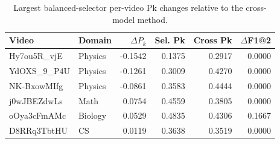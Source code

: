 \begin{table}[t]
\centering
\small
\caption{Largest balanced-selector per-video Pk changes relative to the cross-model method.}
\label{tab:selector_choice_audit}
\begin{tabular}{llrrrr}
\toprule
Video & Domain & $\Delta P_k$ & Sel. Pk & Cross Pk & $\Delta$F1@2 \\
\midrule
Hy7ou5R\_vjE & Physics & -0.1542 & 0.1375 & 0.2917 & 0.0000 \\
YdOXS\_9\_P4U & Physics & -0.1261 & 0.3009 & 0.4270 & 0.0000 \\
NK-BxowMIfg & Physics & -0.0861 & 0.3583 & 0.4444 & 0.0000 \\
j0wJBEZdwLs & Math & 0.0754 & 0.4559 & 0.3805 & 0.0000 \\
oOya3cFmAMc & Biology & 0.0529 & 0.4835 & 0.4306 & 0.1667 \\
D8RRq3TbtHU & CS & 0.0119 & 0.3638 & 0.3519 & 0.0000 \\
\bottomrule
\end{tabular}
\end{table}